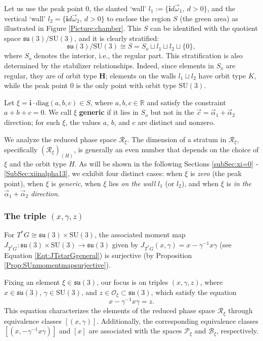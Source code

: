 \documentclass[12pt]{amsart}
\theoremstyle{definition}
\numberwithin{equation}{section}
\def\diag{\mathrm{diag}}
\newcommand{\imagunit}{\mathbf{i}}
\newcommand{\SU}{\mathrm{SU}}
\newcommand{\su}{\mathfrak{su}}
\newcommand{\Reducedxi}{\mathcal{R}_\xi}
\newcommand{\SET}[1]{\{#1\}}
\newcommand{\Pxi}{\mathcal{P}_{\xi}}
\newcommand{\Bxi}{\mathcal{B}_{\xi}}
\newcommand{\Cartan}{\mathbf{H}}
\begin{document}
Let us use the peak point $0$,   the slanted  `wall'  ${l_1}:=\SET{\imagunit d\vec{\omega}_1, ~ d>0}$,   and the vertical `wall' ${l_2}=\SET{\imagunit d\vec{\omega}_2, ~ d>0}$   to enclose the region  $S$ (the green area) as illustrated   in Figure \ref{Picture:chamber}. This $S$ can be identified with the quotient space $\su(3)/\SU(3)$, and it is clearly stratified: 
\begin{equation}\label{Eqt:su3quotientstratified}
\su(3)/\SU(3)\cong S =S_o \sqcup {l_1} \sqcup {l_2} \sqcup \SET{0},
\end{equation}
where $S_o$ denotes the interior,  i.e., the regular part. This stratification   is also determined by the stabilizer relationships. Indeed, since elements in $S_o$ are regular, they are of orbit type $ \Cartan$; elements on the walls ${l_1}\sqcup {l_2} $ have orbit type $K$, while the peak point $0$ is the only point with orbit type $\SU(3)$. 



Let $\xi = \imagunit \cdot \diag(a, b, c) \in S$, where $a, b, c \in \mathbb{R}$ and satisfy the constraint $a + b + c = 0$. We call $\xi$   \textbf{generic} if it lies in $S_o$ but not in the $\vec{c}=\vec{\alpha}_1+\vec{\alpha}_2$  direction; for such $\xi$,   the values $a$, $b$, and $c$ are distinct and nonzero. 

We analyze the reduced phase space \( \Reducedxi \). The dimension of a stratum in $\Reducedxi$, specifically $(\Reducedxi)_{(H)}$, is generally an even number that depends on the choice of $\xi$ and the orbit type $H$.  
As will be shown in the following Sections \ref{subSec:xi=0} - \ref{SubSec:xiinalpha13},  we exhibit  four distinct cases: when $\xi$ is \textit{zero} (the peak point), when $\xi$ is \textit{generic}, when $\xi$ lies \textit{on the wall} ${l_1}$ (or ${l_2}$), and when $\xi$ is \textit{in the $\vec{\alpha}_1+\vec{\alpha}_2$ direction}.


\subsubsection{The triple $(x,\gamma,z)$}

For $T^*G\cong \su(3)\times \SU(3)$, 
  	the associated moment map $J_{T^*G}: \su(3)\times \SU(3)\to \su(3)$  given by 
		$J_{T^*G}(x, \gamma)=x- {\gamma^{-1}}x\gamma $ (see Equation \eqref{Eqt:JTstarGgeneral}) is surjective (by Proposition \ref{Prop:SUnmomentmapsurjective}). 

Fixing an element $\xi\in \su(3)$,  our focus is on triples \( (x, \gamma, z) \), where \( x \in \su(3) \), \( \gamma \in \SU(3) \), and \( z \in \mathcal{O}_\xi \subset \su(3) \), which satisfy the equation  
\begin{equation}
	\label{Eqt:SU3eqt}
	x - {\gamma^{-1}}x\gamma = z.
\end{equation}
This equation characterizes the elements of the reduced phase space \( \Reducedxi \) through equivalence classes \( [(x, \gamma)] \). Additionally, the corresponding equivalence classes \( [(x, -{\gamma^{-1}}x\gamma)] \) and \( [x] \) are associated with the spaces \( \Pxi \) and \( \Bxi  \), respectively.
\end{document}
